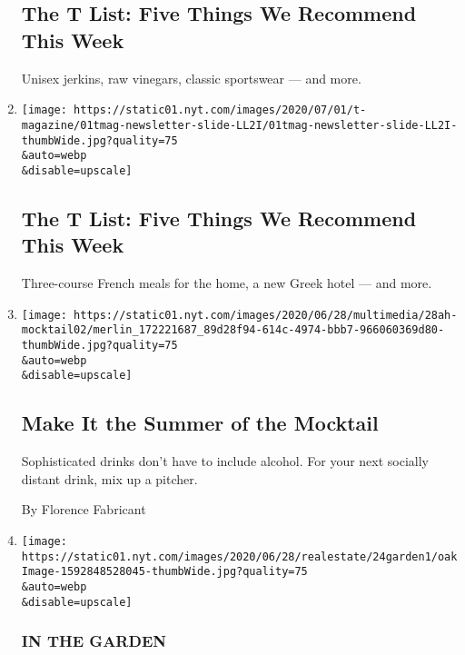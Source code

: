 \begin{enumerate}
  \hypertarget{the-t-list-five-things-we-recommend-this-week-1}{%
  \subsection{The T List: Five Things We Recommend This
  Week}\label{the-t-list-five-things-we-recommend-this-week-1}}

  Unisex jerkins, raw vinegars, classic sportswear --- and more.
\item
  \href{/2020/07/02/t-magazine/kenzo-vans-tlist.html}{}

  \texttt{[image: https://static01.nyt.com/images/2020/07/01/t-magazine/01tmag-newsletter-slide-LL2I/01tmag-newsletter-slide-LL2I-thumbWide.jpg?quality=75\\\&auto=webp\\\&disable=upscale]}

  \hypertarget{the-t-list-five-things-we-recommend-this-week-2}{%
  \subsection{The T List: Five Things We Recommend This
  Week}\label{the-t-list-five-things-we-recommend-this-week-2}}

  Three-course French meals for the home, a new Greek hotel --- and
  more.
\item
  \href{/2020/06/27/at-home/coronavirus-make-mocktails.html}{}

  \texttt{[image: https://static01.nyt.com/images/2020/06/28/multimedia/28ah-mocktail02/merlin\_172221687\_89d28f94-614c-4974-bbb7-966060369d80-thumbWide.jpg?quality=75\\\&auto=webp\\\&disable=upscale]}

  \hypertarget{make-it-the-summer-of-the-mocktail}{%
  \subsection{Make It the Summer of the
  Mocktail}\label{make-it-the-summer-of-the-mocktail}}

  Sophisticated drinks don't have to include alcohol. For your next
  socially distant drink, mix up a pitcher.

  By Florence Fabricant
\item
  \href{/2020/06/24/realestate/grow-garlic-garden-organic.html}{}

  \texttt{[image: https://static01.nyt.com/images/2020/06/28/realestate/24garden1/oakImage-1592848528045-thumbWide.jpg?quality=75\\\&auto=webp\\\&disable=upscale]}

  \hypertarget{in-the-garden}{%
  \subsubsection{IN THE GARDEN}\label{in-the-garden}}


\end{enumerate}
